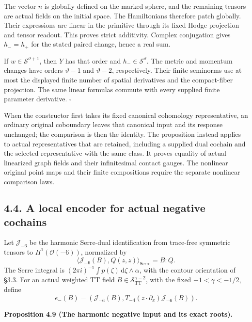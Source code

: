 \documentclass[
  english,
  11pt,
  reqno]{amsart}
\makeatletter
\newcommand{\pandocstatementheading}[1]{%
  \par\if@nobreak\else
    \addpenalty{\@beginparpenalty}%
    \addvspace{.5\baselineskip plus .2\baselineskip minus .2\baselineskip}%
  \fi
  {\normalfont\bfseries #1\par}%
  \nobreak\@afterindenttrue\@afterheading
}
\makeatother
\begin{document}
The vector \(n\) is globally defined on the marked sphere, and the
remaining tensors are actual fields on the initial space. The
Hamiltonians therefore patch globally. Their expressions are linear in
the primitive through its fixed Hodge projection and tensor readout.
This proves strict additivity. Complex conjugation gives
\(h_-=\overline{h_+}\) for the stated paired change, hence a real sum.

If \(w\in\mathscr S^{\vartheta+1}\), then \(Y\) has that order and
\(h_-\in\mathscr S^\vartheta\). The metric and momentum changes have
orders \(\vartheta-1\) and \(\vartheta-2\), respectively. Their finite
seminorms use at most the displayed finite number of spatial derivatives
and the compact-fiber projection. The same linear formulas commute with
every supplied finite parameter derivative. \hfill\(\square\)

When the constructor first takes its fixed canonical cohomology
representative, an ordinary original coboundary leaves that canonical
input and its response unchanged; the comparison is then the identity.
The proposition instead applies to actual representatives that are
retained, including a supplied dual cochain and the selected
representative with the same class. It proves equality of actual
linearized graph fields and their infinitesimal contact gauges. The
nonlinear original point maps and their finite compositions require the
separate nonlinear comparison laws.

\subsection{4.4. A local encoder for actual negative
cochains}\label{a-local-encoder-for-actual-negative-cochains}\label{sec:online-negative-harmonic-input}

Let \(\mathscr J_{-6}\) be the harmonic Serre-dual identification from
trace-free symmetric tensors to \(H^1(\mathcal O(-6))\), normalized by
\[
\langle\mathscr J_{-6}(B),Q(z,z)\rangle_{\mathrm{Serre}}=B:Q.
\] The Serre integral is
\((2\pi i)^{-1}\int p(\zeta)\,\mathrm d\zeta\wedge\alpha\), with the
contour orientation of §3.3. For an actual weighted TT field
\(B\in\mathscr S^{\gamma-2}_{\mathrm{TT}}\), with the fixed
\(-1<\gamma<-1/2\), define%
\begingroup{}\relax{} \[
e_-(B)=\left(\mathscr J_{-6}(B),
T_{-4}(z\cdot\partial_x)\mathscr J_{-6}(B)\right).
\]\endgroup \pandocstatementheading{\leavevmode{}\label{prop:online-negative-harmonic-root-encoder}Proposition 4.9 (The harmonic negative input and its exact roots).}
\end{document}
